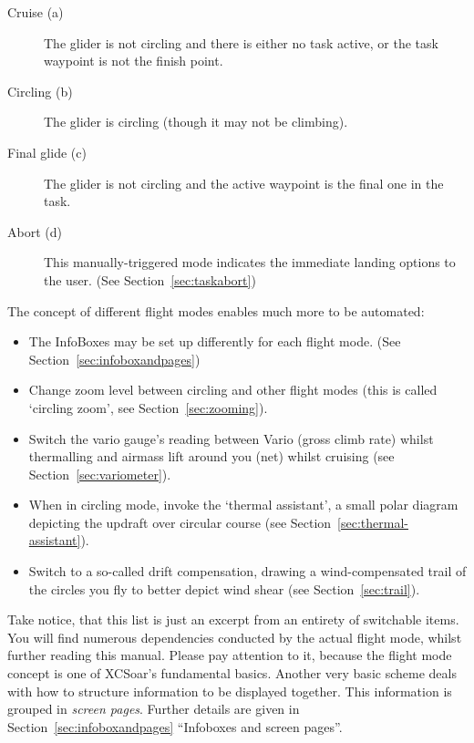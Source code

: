 \begin{description}
\item[Cruise (a)]   The glider is not circling and there is either no 
task active, or the task waypoint is not the finish point.
\item[Circling (b)]  The glider is circling (though it may not be climbing).
\item[Final glide (c)]  The glider is not circling and the active waypoint 
is the final one in the task.
\item[Abort (d)]  This manually-triggered mode indicates the immediate 
landing options to the user. (See Section~\ref{sec:taskabort})
\end{description}

The concept of different flight modes enables much more to be automated:
\begin{itemize}
\item {} The InfoBoxes may be set up differently for 
each flight mode. (See Section~\ref{sec:infoboxandpages})
\item {} Change zoom level between circling and other 
flight modes (this is called `circling zoom', see Section~\ref{sec:zooming}).
\item {} Switch the vario gauge's reading between Vario 
(gross climb rate) whilst thermalling and airmass lift around you (net) whilst cruising 
(see Section~\ref{sec:variometer}).
\item {} When in circling mode, invoke the 
`thermal assistant', a small polar diagram depicting the updraft over 
circular course (see Section~\ref{sec:thermal-assistant}).
\item {} Switch to a so-called drift compensation, 
drawing a wind-compensated trail of the circles you fly to better depict 
wind shear (see Section~\ref{sec:trail}).
\end{itemize}

Take notice, that this list is just an excerpt from an entirety of 
switchable items. You will find numerous dependencies conducted by the 
actual flight mode, whilst further reading this manual. Please pay 
attention to it, because the flight mode concept is one of XCSoar's
fundamental basics. Another very basic scheme deals with how to structure 
information to be displayed together. This information is grouped in
\emph{screen pages}. Further details are given in Section~\ref{sec:infoboxandpages}
``Infoboxes and screen pages''.


